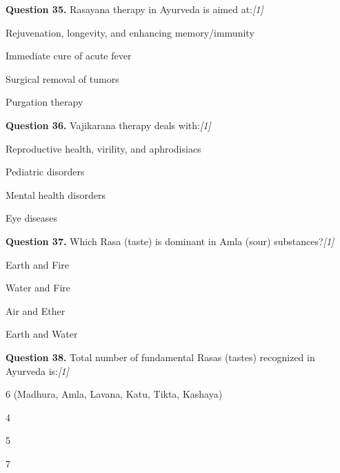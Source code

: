\documentclass[11pt,a4paper]{article}
\newcommand{\pts}[1]{\hfill   \textit{[#1]}}
\begin{document}
\medskip




\noindent   \textbf{Question 35.} Rasayana therapy in Ayurveda is aimed at:\pts{1}

\begin{parts}
  \item Rejuvenation, longevity, and enhancing memory/immunity
  \item Immediate cure of acute fever
  \item Surgical removal of tumors
  \item Purgation therapy
\end{parts}

\medskip




\noindent   \textbf{Question 36.} Vajikarana therapy deals with:\pts{1}

\begin{parts}
  \item Reproductive health, virility, and aphrodisiacs
  \item Pediatric disorders
  \item Mental health disorders
  \item Eye diseases
\end{parts}

\medskip




\noindent   \textbf{Question 37.} Which Rasa (taste) is dominant in Amla (sour) substances?\pts{1}

\begin{parts}
  \item Earth and Fire
  \item Water and Fire
  \item Air and Ether
  \item Earth and Water
\end{parts}

\medskip




\noindent   \textbf{Question 38.} Total number of fundamental Rasas (tastes) recognized in Ayurveda is:\pts{1}

\begin{parts}
  \item 6 (Madhura, Amla, Lavana, Katu, Tikta, Kashaya)
  \item 4
  \item 5
  \item 7
\end{parts}
\end{document}
